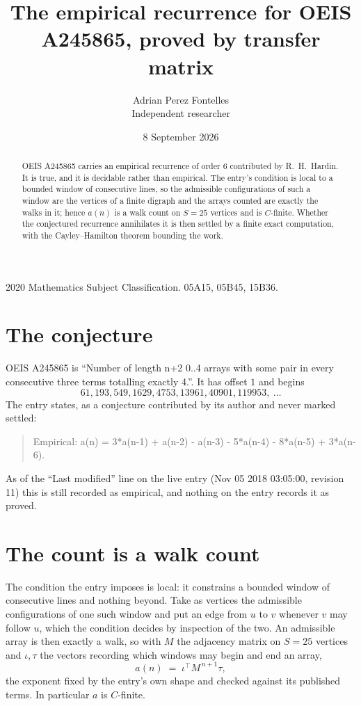 \documentclass[11pt,a4paper]{article}
\title{The empirical recurrence for OEIS A245865, proved by transfer matrix}
\author{Adrian Perez Fontelles\\ \small Independent researcher}
\date{8 September 2026}
\theoremstyle{plain}
\theoremstyle{definition}
\begin{document}
\maketitle

\begin{abstract}
OEIS A245865 carries an empirical recurrence of order $6$ contributed by R.~H.~Hardin. It is
true, and it is decidable rather than empirical. The entry's condition is local to a bounded window of consecutive lines, so
the admissible configurations of such a window are the vertices of a finite digraph and the
arrays counted are exactly the walks in it; hence $a(n)$ is a walk count on $S=25$ vertices
and is $C$-finite. Whether the conjectured recurrence annihilates it is then settled by a
finite exact computation, with the Cayley--Hamilton theorem bounding the work.
\end{abstract}

\noindent\small 2020 Mathematics Subject Classification. 05A15, 05B45, 15B36.\normalsize

\section{The conjecture}

OEIS A245865 is ``Number of length n+2 0..4 arrays with some pair in every consecutive three terms totalling exactly 4.''. It has offset $1$ and begins
\[
61, 193, 549, 1629, 4753, 13961, 40901, 119953,\ \dots
\]
The entry states, as a conjecture contributed by its author and never marked settled:
\begin{quote}
Empirical: a(n) = 3*a(n-1) + a(n-2) - a(n-3) - 5*a(n-4) - 8*a(n-5) + 3*a(n-6).
\end{quote}
As of the ``Last modified'' line on the live entry (Nov 05 2018 03:05:00, revision 11) this is still
recorded as empirical, and nothing on the entry records it as proved.

\section{The count is a walk count}

The condition the entry imposes is local: it constrains a bounded window of consecutive lines and nothing beyond. Take as
vertices the admissible configurations of one such window and put an edge from $u$ to $v$
whenever $v$ may follow $u$, which the condition decides by inspection of the two. An
admissible array is then exactly a walk, so with $M$ the adjacency matrix on $S=25$ vertices
and $\iota,\tau$ the vectors recording which windows may begin and end an array,
\[
a(n)\;=\;\iota^{\!\top}M^{\,n+1}\tau ,
\]
the exponent fixed by the entry's own shape and checked against its published terms. In
particular $a$ is $C$-finite.
\end{document}
